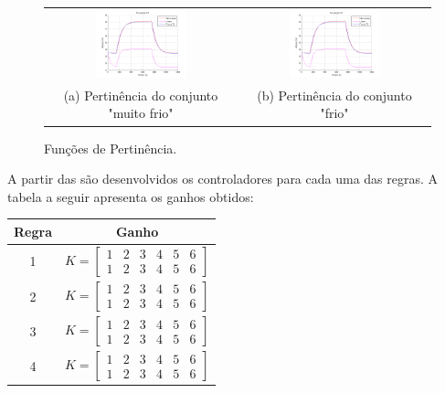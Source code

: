 \begin{figure}[H]
	\centering
	\begin{tabular}{cc}
		\includegraphics[width=0.5\textwidth,keepaspectratio]{img/FM_h1_5_10_15.png} &
		\includegraphics[width=0.5\textwidth,keepaspectratio]{img/FM_h1_5_10_15.png} \\
		(a) Pertinência do conjunto "muito frio" &
		(b) Pertinência do conjunto "frio"
	\end{tabular}
	\caption{\label{imgTS15} Funções de Pertinência.}
\end{figure}

A partir das  são desenvolvidos os controladores para cada uma das regras. A tabela a seguir apresenta os ganhos obtidos:
\begin{center}
	\begin{tabular}{|c|c|}
		\hline
		Regra & Ganho \\ \hline
		 1 & $ K = 
			\begin{bmatrix}
				1 & 2 & 3 & 4 & 5 & 6 \\
				1 & 2 & 3 & 4 & 5 & 6
			\end{bmatrix}$ \\[20pt] \hline
		2 & $ K = 
			\begin{bmatrix}
				1 & 2 & 3 & 4 & 5 & 6 \\
				1 & 2 & 3 & 4 & 5 & 6
			\end{bmatrix}$ \\[20pt] \hline
		3 & $ K = 
			\begin{bmatrix}
				1 & 2 & 3 & 4 & 5 & 6 \\
				1 & 2 & 3 & 4 & 5 & 6
			\end{bmatrix}$ \\[20pt] \hline
		4 & $ K = 
			\begin{bmatrix}
				1 & 2 & 3 & 4 & 5 & 6 \\
				1 & 2 & 3 & 4 & 5 & 6
			\end{bmatrix}$ \\[20pt] \hline
	\end{tabular}
\end{center}

